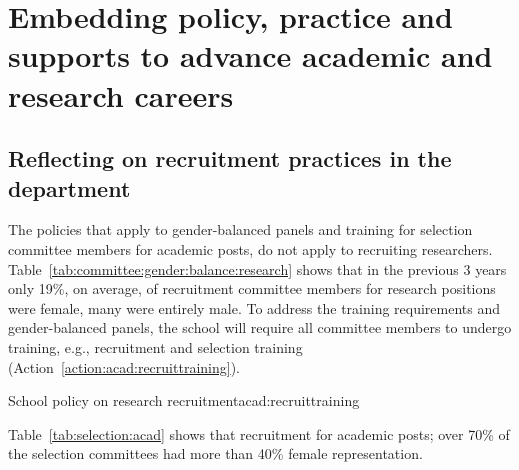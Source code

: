 \newpage 
\section{Embedding policy, practice and supports to advance academic and research careers}
\label{sec:academic}



\subsection{Reflecting on recruitment practices in the department}



The policies that apply to gender-balanced panels and training for selection committee members for academic posts, do not apply to recruiting researchers.  Table~\ref{tab:committee:gender:balance:research} shows that in the previous 3 years only 19\%, on average,  of recruitment committee members for research positions were female, many were entirely male. To address the training requirements and gender-balanced panels, the school will require all committee members to undergo training, e.g., recruitment and selection training (Action~\ref{action:acad:recruittraining}).





\begin{actionblock}{\ksspace{}School policy on research recruitment}{acad:recruittraining}
\actrecruitmenttraining
\hfill{
    \hypersetup{hidelinks}
    \hyperlink{c7}{\gotoactionsymbol{}}
}
\end{actionblock}




Table~\ref{tab:selection:acad} shows that recruitment for academic posts;  over 70\% of the selection committees had more than 40\% female representation.

